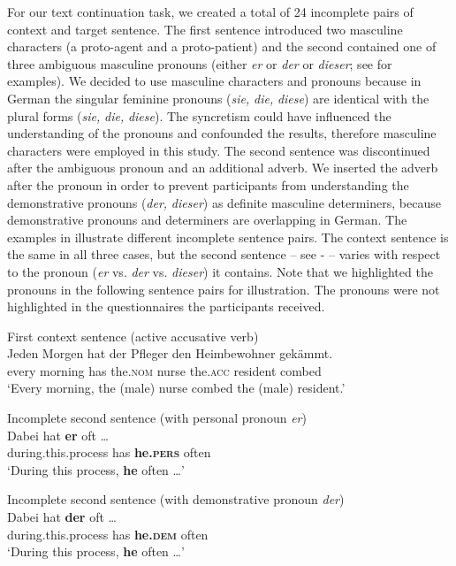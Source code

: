 \documentclass[output=paper,colorlinks,citecolor=brown]{langscibook}
\begin{document}
For our text continuation task, we created a total of 24 incomplete pairs of context and target sentence. The first sentence introduced two masculine characters (a proto-agent and a proto-patient) and the second contained one of three ambiguous masculine pronouns (either \textit{er} or \textit{der} or \textit{dieser}; see  for examples). We decided to use masculine characters and pronouns because in German the singular feminine pronouns (\textit{sie,} \textit{die,} \textit{diese}) are identical with the plural forms (\textit{sie,} \textit{die,} \textit{diese}). The syncretism could have influenced the understanding of the pronouns and confounded the results, therefore masculine characters were employed in this study. The second sentence was discontinued after the ambiguous pronoun and an additional adverb. We inserted the adverb after the pronoun in order to prevent participants from understanding the demonstrative pronouns (\textit{der,} \textit{dieser}) as definite masculine determiners, because demonstrative pronouns and determiners are overlapping in German. The examples in  illustrate different incomplete sentence pairs. The context sentence  is the same in all three cases, but the second sentence -- see - -- varies with respect to the pronoun (\textit{er} vs. \textit{der} vs. \textit{dieser}) it contains. Note that we highlighted the pronouns in the following sentence pairs for illustration. The pronouns were not highlighted in the questionnaires the participants received. 

\ea\label{ex:fuchs:2}
\ea\label{ex:fuchs:2a} First context sentence (active accusative verb)\\
\gll Jeden Morgen hat der Pfleger den Heimbewohner gekämmt.\\
     every morning has the.\textsc{nom} nurse the.\textsc{acc} resident combed\\
\glt ‘Every morning, the (male) nurse combed the (male) resident.’

\ex\label{ex:fuchs:2b}  Incomplete second sentence (with personal pronoun \textit{er})\\
\gll Dabei hat \textbf{er} oft …\\
     during.this.process has \textbf{he.\textsc{pers}} often\\
\glt ‘During this process, \textbf{he} often …’

\ex\label{ex:fuchs:2c}  Incomplete second sentence (with demonstrative pronoun \textit{der})\\
\gll Dabei hat \textbf{der} oft …\\
     during.this.process has \textbf{he.\textsc{dem}} often\\
\glt ‘During this process, \textbf{he} often …’
\end{document}
